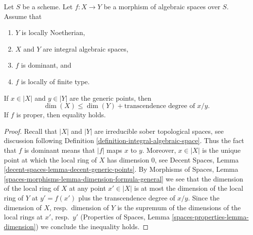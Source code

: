 \begin{lemma}
\label{lemma-alteration-dimension}
Let $S$ be a scheme. Let $f : X \to Y$ be a morphism of algebraic spaces
over $S$. Assume that
\begin{enumerate}
\item $Y$ is locally Noetherian,
\item $X$ and $Y$ are integral algebraic spaces,
\item $f$ is dominant, and
\item $f$ is locally of finite type.
\end{enumerate}
If $x \in |X|$ and $y \in |Y|$ are the generic points, then
$$
\dim(X) \leq \dim(Y) + \text{transcendence degree of }x/y.
$$
If $f$ is proper, then equality holds.
\end{lemma}

\begin{proof}
Recall that $|X|$ and $|Y|$ are irreducible sober topological spaces, see
discussion following Definition \ref{definition-integral-algebraic-space}.
Thus the fact that $f$ is dominant means that $|f|$ maps $x$ to $y$.
Moreover, $x \in |X|$ is the unique point at which the
local ring of $X$ has dimension $0$, see
Decent Spaces, Lemma \ref{decent-spaces-lemma-decent-generic-points}.
By Morphisms of Spaces, Lemma
\ref{spaces-morphisms-lemma-dimension-formula-general}
we see that the dimension of the local ring of $X$ at
any point $x' \in |X|$ is at most the dimension of the local
ring of $Y$ at $y' = f(x')$ plus the transcendence degree of $x/y$.
Since the dimension of $X$, resp.\ dimension of $Y$ is the
supremum of the dimensions of the local rings at $x'$, resp.\ $y'$
(Properties of Spaces, Lemma \ref{spaces-properties-lemma-dimension})
we conclude the inequality holds.


\end{proof}
